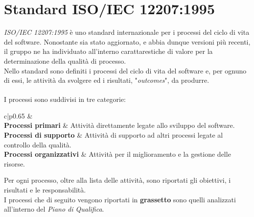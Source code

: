 \section{Standard ISO/IEC 12207:1995}
\textit{ISO/IEC 12207:1995} è uno standard
internazionale per i processi del ciclo di vita del software.
Nonostante sia stato aggiornato, e abbia dunque versioni più recenti, il gruppo
ne ha individuato all'interno carattarestiche di valore per la determinazione
della qualità di processo.\\
\noindent
Nello standard sono definiti i processi del ciclo di vita del
software e, per ognuno di essi, le attività da svolgere ed i
risultati, "\textit{outcomes}", da produrre.\\ \\
\noindent
I processi sono suddivisi in tre categorie:

\setlength\extrarowheight{5pt}

\begin{table}[h!]
    \centering
    \begin{tabular}{c|p{0.65\linewidth}}
        &  \\[4pt]
	    	\textbf{Processi primari} & Attività direttamente legate allo sviluppo del software. \\[4pt]
	    	\textbf{Processi di supporto} & Attività di supporto ad altri processi legate al controllo della qualità. \\[4pt]
	    	\textbf{Processi organizzativi} & Attività per il miglioramento e la gestione delle risorse.\\[4pt]
    \end{tabular}
    \caption{Categorie di processo}
\end{table}

\noindent
Per ogni processo, oltre alla lista delle attività, sono riportati
gli obiettivi, i risultati e le responsabilità.\\
I processi che di seguito vengono riportati in \textbf{grassetto} sono quelli analizzati all'interno
del \textit{Piano di Qualifica}.


